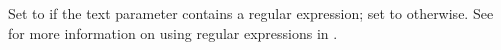     Set to \gdrefbooleantrue if the text parameter contains a regular
    expression; set to \gdrefbooleanfalse otherwise. See 
    for more information on using regular expressions in \GD{}.